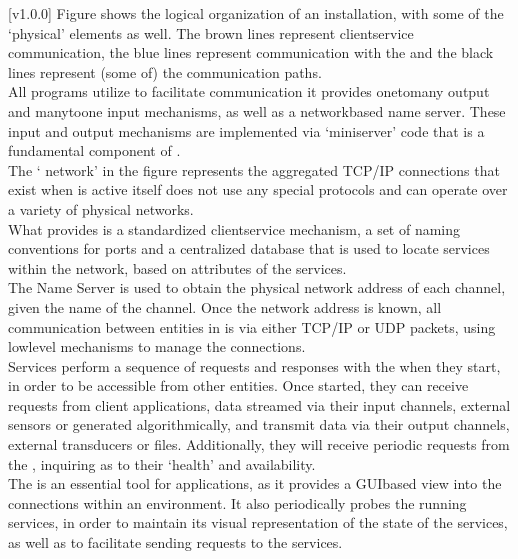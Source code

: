 [v1.0.0]
\condPage{}
Figure  shows the logical organization of an \mplusm{}
installation, with some of the `physical' elements as well.
The brown lines represent client\longDash{}service communication, the blue lines represent
communication with the  and the black lines represent
(some of) the \yarp{} communication paths.\\

All \mplusm{} programs utilize \yarp{} to facilitate communication \longDash{} it provides
one\longDash{}to\longDash{}many output and many\longDash{}to\longDash{}one input
mechanisms, as well as a network\longDash{}based name server.
These input and output mechanisms are implemented via `mini\longDash{}server' code that is
a fundamental component of \yarp.\\

The `\yarp{} network' in the figure represents the aggregated TCP/IP connections that
exist when \yarp{} is active \longDash{} \yarp{} itself does not use any special protocols
and can operate over a variety of physical networks.\\

What \mplusm{} provides is a standardized client\longDash{}service mechanism, a set of
naming conventions for \yarp{} ports and a centralized database that is used to locate
services within the \yarp{} network, based on attributes of the services.\\

The \yarp{} Name Server is used to obtain the physical network address of each \mplusm{}
channel, given the name of the channel.
Once the network address is known, all communication between entities in \mplusm{} is via
either TCP/IP or UDP packets, using \yarp{} low\longDash{}level mechanisms to manage the
connections.\\

Services perform a sequence of requests and responses with the
 when they start, in order to be accessible from other
\mplusm{} entities.
Once started, they can receive requests from client applications, data streamed via their
input channels, external sensors or generated algorithmically, and transmit data via their
output channels, external transducers or files.
Additionally, they will receive periodic requests from the
, inquiring as to their `health' and availability.\\

The \emph{\MMMU} is an essential tool for \mplusm{} applications, as it provides a
GUI\longDash{}based view into the connections within an \mplusm{} environment.
It also periodically probes the running services, in order to maintain its visual
representation of the state of the services, as well as to facilitate sending requests to
the services.
\primaryEnd{}
